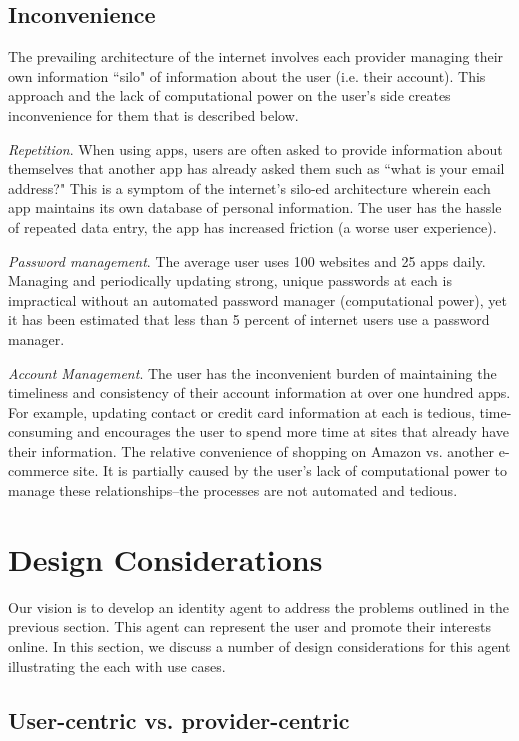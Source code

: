 \documentclass[11pt, oneside]{article}   	%
\begin{document}
\subsection{Inconvenience}
The prevailing architecture of the internet involves each provider managing their own  information ``silo" of information about the user (i.e. their account). This approach and the lack of computational power on the user's side creates inconvenience for them that is described below.

\emph{Repetition}. When using apps, users are often asked to provide information about themselves that another app has already asked them such as ``what is your email address?" This is a symptom of the internet's silo-ed architecture wherein each app maintains its own database of personal information. The user has the hassle of repeated data entry, the app has increased friction (a worse user experience).

\emph{Password management}. The average user uses 100 websites and 25 apps daily. Managing and periodically updating strong, unique passwords at each is  impractical without an automated password manager (computational power), yet it has been estimated that less than 5 percent of internet users use a password manager. 

\emph{Account Management}. The user has the inconvenient burden of maintaining the timeliness and consistency of their account information at over one hundred apps. For example, updating contact or credit card information at each is tedious, time-consuming and encourages the user to spend more time at sites that already have their information. The relative convenience of shopping on Amazon vs. another e-commerce site. It is partially caused by the user's lack of computational power to manage these relationships--the processes are not automated and tedious.

\section{Design Considerations}
Our vision is to develop an identity agent to address the problems outlined in the previous section. This agent  can represent the user and promote their interests online. In this section, we discuss a number of design considerations for this agent illustrating the each with use cases.

\subsection{User-centric vs. provider-centric}
\end{document}
